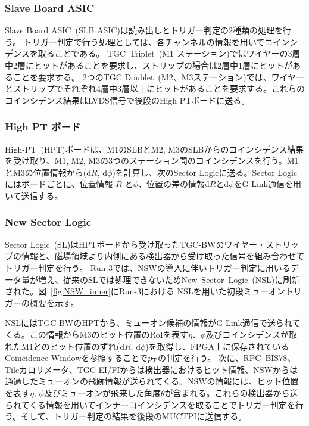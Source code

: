 \subsubsection{Slave Board ASIC}
Slave Board ASIC~(SLB ASIC)は読み出しとトリガー判定の2種類の処理を行う。
トリガー判定で行う処理としては、各チャンネルの情報を用いてコインシデンスを取ることである。
TGC~Triplet~(M1 ステーション)ではワイヤーの3層中2層にヒットがあることを要求し、ストリップの場合は2層中1層にヒットがあることを要求する。
2つのTGC Doublet~(M2、M3ステーション)では、ワイヤーとストリップでそれぞれ4層中3層以上にヒットがあることを要求する。これらのコインシデンス結果はLVDS信号で後段のHigh PTボードに送る。

\subsubsection{High PT ボード}
High-PT~(HPT)ボードは、M1のSLBとM2, M3のSLBからのコインシデンス結果を受け取り、M1, M2, M3の3つのステーション間のコインシデンスを行う。M1とM3の位置情報から(d$R$, d$\phi$)を計算し、次のSector Logicに送る。Sector Logicにはボードごとに、位置情報 $R$ と$\phi$、位置の差の情報d$R$とd$\phi$をG-Link通信を用いて送信する。

\subsubsection{New Sector Logic}
Sector Logic~(SL)はHPTボードから受け取ったTGC-BWのワイヤー・ストリップの情報と、磁場領域より内側にある検出器から受け取った信号を組み合わせてトリガー判定を行う。
Run-3では、NSWの導入に伴いトリガー判定に用いるデータ量が増え、従来のSLでは処理できないためNew~Sector~Logic~(NSL)に刷新された。図~\ref{fig:NSW_inner}にRun-3における NSLを用いた初段ミューオントリガーの概要を示す。

NSLにはTGC-BWのHPTから、ミューオン候補の情報がG-Link通信で送られてくる。この情報からM3のヒット位置のRoIを表す$\eta$、$\phi$及びコインシデンスが取れたM1とのヒット位置のずれ(d$R$, d$\phi$)を取得し、FPGA上に保存されているCoincidence Windowを参照することで$p_{\rm{T}}$の判定を行う。
次に、RPC~BIS78、Tileカロリメータ、TGC-EI/FIからは検出器におけるヒット情報、NSWからは通過したミューオンの飛跡情報が送られてくる。NSWの情報には、ヒット位置を表す$\eta$, $\phi$及びミューオンが飛来した角度$\theta$が含まれる。これらの検出器から送られてくる情報を用いてインナーコインシデンスを取ることでトリガー判定を行う。そして、トリガー判定の結果を後段のMUCTPIに送信する。

